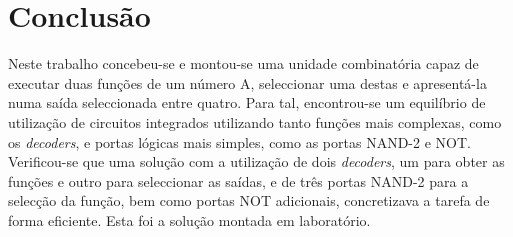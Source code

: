 \documentclass[a4paper,12pt]{article}
\begin{document}
\section{Conclusão}
Neste trabalho concebeu-se e montou-se uma unidade combinatória capaz de executar duas funções de um número A, seleccionar uma destas e apresentá-la numa saída seleccionada entre quatro. Para tal, encontrou-se um equilíbrio de utilização de circuitos integrados utilizando tanto funções mais complexas, como os {\it decoders}, e portas lógicas mais simples, como as portas NAND-2 e NOT. Verificou-se que uma solução com a utilização de dois {\it decoders}, um para obter as funções e outro para seleccionar as saídas, e de três portas NAND-2 para a selecção da função, bem como portas NOT adicionais, concretizava a tarefa de forma eficiente. Esta foi a solução montada em laboratório.
\end{document}
